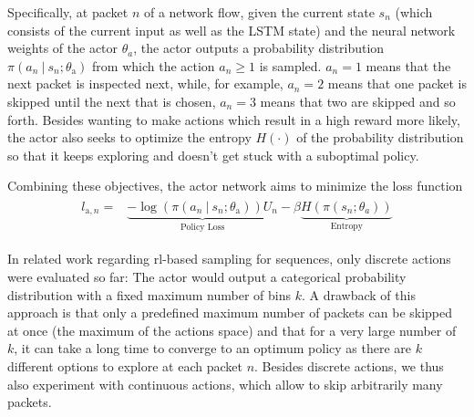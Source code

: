 \documentclass[conference]{IEEEtran}
\newcommand\givenbase[1][]{\:#1\lvert\:}
\let\given\givenbase
\begin{document}
Specifically, at packet $n$ of a network flow, given the current state $s_n$ (which consists of the current input as well as the LSTM state) and the neural network weights of the actor $\theta_a$, the actor outputs a probability distribution $\pi \left( a_n \given s_n ; \theta_\text{a} \right)$ from which the action $a_n \ge 1$ is sampled. $a_n=1$ means that the next packet is inspected next, while, for example, $a_n=2$ means that one packet is skipped until the next that is chosen, $a_n = 3$ means that two are skipped and so forth. Besides wanting to make actions which result in a high reward more likely, the actor also seeks to optimize the entropy $H(\cdot)$ of the probability distribution so that it keeps exploring and doesn't get stuck with a suboptimal policy.

Combining these objectives, the actor network aims to minimize the loss function
\begin{align}
\begin{split}
l_{\text{a},n} =& \underbrace{ -\log \left( \pi \left( a_n \given s_n ; \theta_\text{a} \right) \right) U_n}_{\text{Policy Loss}} - \beta \underbrace{H\left( \pi\left( s_n; \theta_a \right)\right) }_{\text{Entropy}}
\end{split}\label{eq:actor}
\end{align}


In related work regarding \gls{rl}-based sampling for sequences, only discrete actions were evaluated so far: The actor would output a categorical probability distribution with a fixed maximum number of bins $k$. A drawback of this approach is that only a predefined maximum number of packets can be skipped at once (the maximum of the actions space) and that for a very large number of $k$, it can take a long time to converge to an optimum policy as there are $k$ different options to explore at each packet $n$. Besides discrete actions, we thus also experiment with continuous actions, which allow to skip arbitrarily many packets. %
\end{document}
